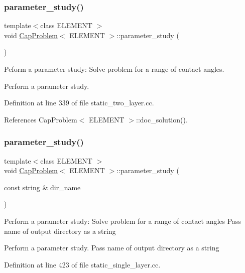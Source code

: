 \subsubsection{\texorpdfstring{parameter\+\_\+study()}{parameter\_study()}\hspace{0.1cm}{\footnotesize\ttfamily [1/2]}}
{\footnotesize\ttfamily template$<$class E\+L\+E\+M\+E\+NT $>$ \\
void \hyperlink{classCapProblem}{Cap\+Problem}$<$ E\+L\+E\+M\+E\+NT $>$\+::parameter\+\_\+study (\begin{DoxyParamCaption}{ }\end{DoxyParamCaption})}



Peform a parameter study\+: Solve problem for a range of contact angles. 

Perform a parameter study. 

Definition at line 339 of file static\+\_\+two\+\_\+layer.\+cc.



References Cap\+Problem$<$ E\+L\+E\+M\+E\+N\+T $>$\+::doc\+\_\+solution().

\mbox{\label{classCapProblem_af54251f12b42b85c6caf88e5214f45da}} 
\subsubsection{\texorpdfstring{parameter\+\_\+study()}{parameter\_study()}\hspace{0.1cm}{\footnotesize\ttfamily [2/2]}}
{\footnotesize\ttfamily template$<$class E\+L\+E\+M\+E\+NT $>$ \\
void \hyperlink{classCapProblem}{Cap\+Problem}$<$ E\+L\+E\+M\+E\+NT $>$\+::parameter\+\_\+study (\begin{DoxyParamCaption}\item[{const string \&}]{dir\+\_\+name }\end{DoxyParamCaption})}

Perform a parameter study\+: Solve problem for a range of contact angles Pass name of output directory as a string

Perform a parameter study. Pass name of output directory as a string 

Definition at line 423 of file static\+\_\+single\+\_\+layer.\+cc.



